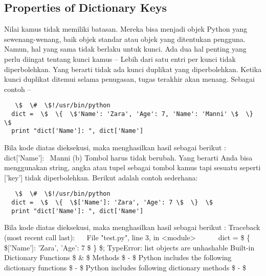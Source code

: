 \subsection{Properties of Dictionary Keys} 
Nilai kamus tidak memiliki batasan. Mereka bisa menjadi objek Python yang sewenang-wenang, baik objek standar atau objek yang ditentukan pengguna. Namun, hal yang sama tidak berlaku untuk kunci. 
Ada dua hal penting yang perlu diingat tentang kunci kamus – 
Lebih dari satu entri per kunci tidak diperbolehkan. Yang berarti tidak ada kunci duplikat yang diperbolehkan. Ketika kunci duplikat ditemui selama penugasan, tugas terakhir akan menang. Sebagai contoh – 
\begin{verbatim}   
   \$  \#  \$!/usr/bin/python 
  dict =  \$  \{  \$'Name': 'Zara', 'Age': 7, 'Name': 'Manni' \$  \}  \$ 
  print "dict['Name']: ", dict['Name']
\end{verbatim}  
Bila kode diatas dieksekusi, maka menghasilkan hasil sebagai berikut : 
  dict['Name']:~ Manni 
(b) Tombol harus tidak berubah. Yang berarti Anda bisa menggunakan string, angka atau tupel sebagai tombol kamus tapi sesuatu seperti ['key'] tidak diperbolehkan. Berikut adalah contoh sederhana: 
\begin{verbatim}   
   \$  \#  \$!/usr/bin/python 
  dict =  \$  \{  \$['Name']: 'Zara', 'Age': 7 \$  \}  \$ 
  print "dict['Name']: ", dict['Name']
\end{verbatim}
Bila kode diatas dieksekusi, maka menghasilkan hasil sebagai berikut : 
  Traceback (most recent call last): 
~~     File "test.py", line 3, in <module> 
~~~~~     dict =  \$  \{  \$['Name']: 'Zara', 'Age': 7 \$  \}  \$; 
  TypeError: list objects are unhashable 
Built-in Dictionary Functions  \$  \&  \$ Methods  \$ - \$ 
Python includes the following dictionary functions  \$ - \$ 
Python includes following dictionary methods  \$ - \$ 

